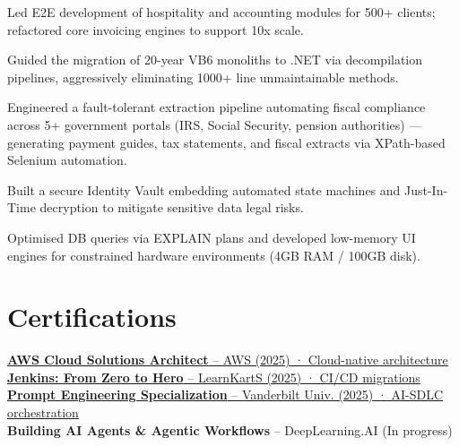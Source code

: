 \documentclass[]{styling}
\begin{document}
\begin{minipage}[t]{0.73\textwidth}
%
\vspace{2pt}
\begin{tightemize}
\item Led E2E development of hospitality and accounting modules for 500+ clients; refactored core invoicing engines to support 10x scale.
\item Guided the migration of 20-year VB6 monoliths to .NET via decompilation pipelines, aggressively eliminating 1000+ line unmaintainable methods.
\item Engineered a fault-tolerant extraction pipeline automating fiscal compliance across 5+ government portals (IRS, Social Security, pension authorities) --- generating payment guides, tax statements, and fiscal extracts via XPath-based Selenium automation.
\item Built a secure Identity Vault embedding automated state machines and Just-In-Time decryption to mitigate sensitive data legal risks.
\item Optimised DB queries via EXPLAIN plans and developed low-memory UI engines for constrained hardware environments (4GB RAM / 100GB disk).
\end{tightemize}
\sectionsep


\section{Certifications}
\justifying
\href{https://www.coursera.org/account/accomplishments/specialization/N2KXEZEGW96J}{\textbf{AWS Cloud Solutions Architect} -- AWS (2025) · Cloud-native architecture} \\
\href{https://www.coursera.org/account/accomplishments/specialization/certificate/ZXTDN19QJXYU}{\textbf{Jenkins: From Zero to Hero} -- LearnKartS (2025) · CI/CD migrations} \\
\href{https://www.coursera.org/account/accomplishments/specialization/HPTQ605HG1RT}{\textbf{Prompt Engineering Specialization} -- Vanderbilt Univ. (2025) · AI-SDLC orchestration} \\
\textbf{Building AI Agents \& Agentic Workflows} -- DeepLearning.AI (In progress)
\sectionsep

\end{minipage}
\end{document}

